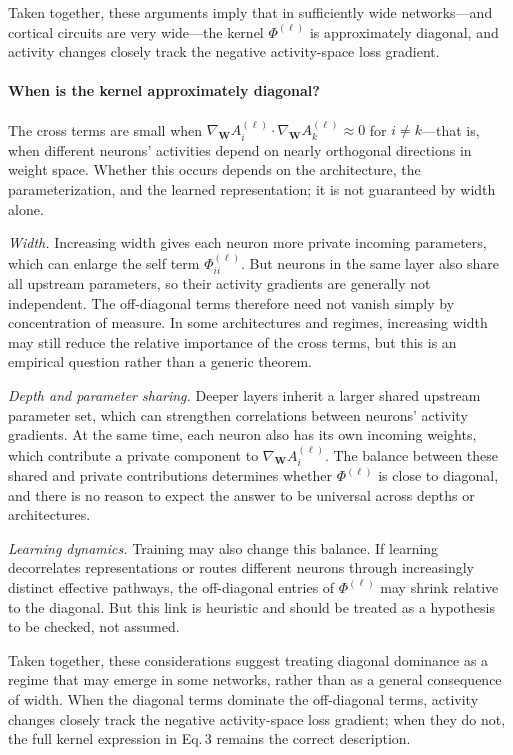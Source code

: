 \documentclass[10pt]{article}
\newcommand{\vW}{\mathbf{W}}
\newcommand{\grad}{\nabla_{\!\vW}}
\begin{document}
Taken together, these arguments imply that in sufficiently wide networks---and cortical circuits are very wide---the kernel $\Phi^{(\ell)}$ is approximately diagonal, and activity changes closely track the negative activity-space loss gradient.
\fi
\paragraph{When is the kernel approximately diagonal?}
The cross terms are small when $\grad A_i^{(\ell)} \cdot \grad A_k^{(\ell)} \approx 0$ for $i\neq k$---that is, when different neurons' activities depend on nearly orthogonal directions in weight space.  Whether this occurs depends on the architecture, the parameterization, and the learned representation; it is not guaranteed by width alone.

\emph{Width.}  Increasing width gives each neuron more private incoming parameters, which can enlarge the self term $\Phi^{(\ell)}_{ii}$.  But neurons in the same layer also share all upstream parameters, so their activity gradients are generally not independent.  The off-diagonal terms therefore need not vanish simply by concentration of measure.  In some architectures and regimes, increasing width may still reduce the relative importance of the cross terms, but this is an empirical question rather than a generic theorem.

\emph{Depth and parameter sharing.}  Deeper layers inherit a larger shared upstream parameter set, which can strengthen correlations between neurons' activity gradients.  At the same time, each neuron also has its own incoming weights, which contribute a private component to $\grad A_i^{(\ell)}$.  The balance between these shared and private contributions determines whether $\Phi^{(\ell)}$ is close to diagonal, and there is no reason to expect the answer to be universal across depths or architectures.

\emph{Learning dynamics.}  Training may also change this balance.  If learning decorrelates representations or routes different neurons through increasingly distinct effective pathways, the off-diagonal entries of $\Phi^{(\ell)}$ may shrink relative to the diagonal.  But this link is heuristic and should be treated as a hypothesis to be checked, not assumed.

Taken together, these considerations suggest treating diagonal dominance as a regime that may emerge in some networks, rather than as a general consequence of width.  When the diagonal terms dominate the off-diagonal terms, activity changes closely track the negative activity-space loss gradient; when they do not, the full kernel expression in Eq.\,3 remains the correct description.
\end{document}
